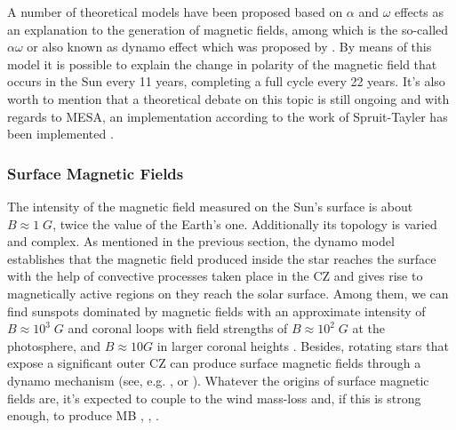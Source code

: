 \documentclass[fleqn,usenatbib]{mnras}
\begin{document}
A number of theoretical models have been proposed based on $\alpha$ and $\omega$ effects as an explanation to the generation of magnetic fields, among which is the so-called $\alpha\omega$ or also known as dynamo effect which was proposed by \citet{Spruit2002}. By means of this model it is possible to explain the change in polarity of the magnetic field that occurs in the Sun every 11 years, completing a full cycle every 22 years. It's also worth to mention that a theoretical debate on this topic is still ongoing \citep{Denissenkov2007} and with regards to MESA, an implementation according to the work of Spruit-Tayler has been implemented \citep{Paxton2013}.\par

\subsubsection{Surface Magnetic Fields} \label{surf_mf}
The intensity of the magnetic field measured on the Sun's surface is about $B\approx1\; G$, twice the value of the Earth's one. Additionally its topology is varied and complex. As mentioned in the previous section, the dynamo model establishes that the magnetic field produced inside the star reaches the surface with the help of convective processes taken place in the CZ and gives rise to magnetically active regions on they reach the solar surface. Among them, we can find sunspots dominated by magnetic fields with an approximate intensity of $B\approx10^3\; G$ and coronal loops with field strengths of $B\approx10^2\; G$ at the photosphere, and $B\approx10 G$ in larger coronal heights \citep{Aschwanden2014}. Besides, rotating stars that expose a significant outer CZ can produce surface magnetic fields through a dynamo mechanism (see, e.g. \citet{Brandenburg2004}, \citet{Charbonneau2010} or \citet{Brun2017}). Whatever the origins of surface magnetic fields are, it's expected to couple to the wind mass-loss and, if this is strong enough, to produce MB \citet{UdDoula2002}, \citet{Ud-Doula2007}, \citet{Ud-Doula2008} \citet{Meynet2010}.\par
\end{document}
